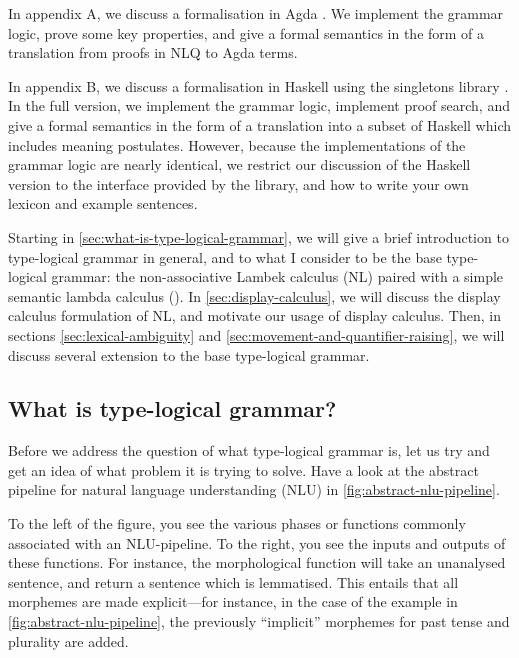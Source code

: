 In appendix A, we discuss a formalisation in Agda \citep{norell2009}.
We implement the grammar logic, prove some key properties, and give a
formal semantics in the form of a translation from proofs in NLQ to
Agda terms.

In appendix B, we discuss a formalisation in Haskell
\citep{marlow2010} using the singletons library
\citet{eisenberg2012}. In the full version, we implement the grammar
logic, implement proof search, and give a formal semantics in the form
of a translation into a subset of Haskell which includes meaning
postulates. However, because the implementations of the grammar logic
are nearly identical, we restrict our discussion of the Haskell
version to the interface provided by the library, and how to write
your own lexicon and example sentences.

Starting in \autoref{sec:what-is-type-logical-grammar}, we will give a
brief introduction to type-logical grammar in general, and to what I
consider to be the base type-logical grammar: the non-associative
Lambek calculus (NL) paired with a simple semantic lambda calculus
(\lamET).
In \autoref{sec:display-calculus}, we will discuss the display
calculus formulation of NL, and motivate our usage of display
calculus.
Then, in sections \ref{sec:lexical-ambiguity} and
\ref{sec:movement-and-quantifier-raising}, we will discuss several
extension to the base type-logical grammar.

\subsection{What is type-logical grammar?}
\label{sec:what-is-type-logical-grammar}

Before we address the question of what type-logical grammar is, let us
try and get an idea of what problem it is trying to solve. Have a look
at the abstract pipeline for natural language understanding (NLU) in
\autoref{fig:abstract-nlu-pipeline}.



To the left of the figure, you see the various phases or functions
commonly associated with an NLU-pipeline. To the right, you see the
inputs and outputs of these functions.
For instance, the morphological function will take an unanalysed
sentence, and return a sentence which is lemmatised. This entails that
all morphemes are made explicit---for instance, in the case of the
example in \autoref{fig:abstract-nlu-pipeline}, the previously
``implicit'' morphemes for past tense and plurality are added.

